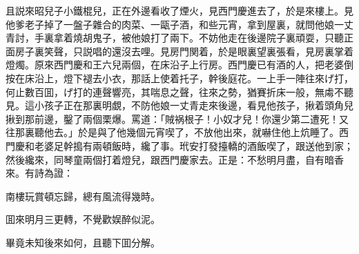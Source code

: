 且説來昭兒子小鐵棍兒，正在外邊看收了煙火，見西門慶進去了，於是來樓上。見他爹老子掉了一盤子雜合的肉菜、一甌子酒，和些元宵，拿到屋裏，就問他娘一丈青討，手裏拿着燒胡鬼子，被他娘打了兩下。不妨他走在後邊院子裏頑耍，只聽正面房子裏笑聲，只説唱的還沒去哩。見房門関着，於是眼裏望裏張看，見房裏掌着燈燭。原來西門慶和王六兒兩個，在床沿子上行房。西門慶已有酒的人，把老婆倒按在床沿上，燈下褪去小衣，那話上使着托子，幹後庭花。一上手一陣往來げ打，何止數百囬，げ打的連聲響亮，其喘息之聲，往來之勢，猶賽折床一般，無䖏不聽見。這小孩子正在那裏明覷，不防他娘一丈青走來後邊，看見他孩子，揪着頭角兒揪到那前邊，鑿了兩個栗爆。罵道：「賊祸根子！小奴才兒！你還少第二遭死！又往那裏聽他去。」於是與了他幾個元宵喫了，不放他出來，就嚇住他上炕睡了。西門慶和老婆足幹搗有兩頓飯時，纔了事。玳安打發擡轎的酒飯喫了，跟送他到家；然後纔來，同琴童兩個打着燈兒，跟西門慶家去。正是：不愁明月盡，自有暗香來。有詩為證：

\begin{myquote}
南樓玩賞頓忘歸，總有風流得幾時。

囬來明月三更轉，不覺歡娱醉似泥。
\end{myquote}

畢竟未知後來如何，且聽下囬分解。

